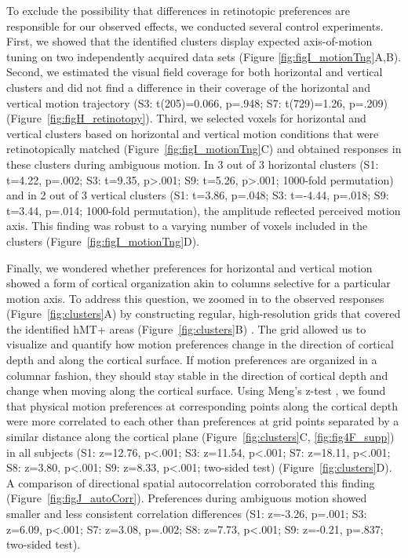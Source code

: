 To exclude the possibility that differences in retinotopic preferences are responsible for our observed effects, we conducted several control experiments. First, we showed that the identified clusters display expected axis-of-motion tuning on two independently acquired data sets (Figure  \ref{fig:figI_motionTng}A,B). Second, we estimated the visual field coverage for both horizontal and vertical clusters and did not find a difference in their coverage of the horizontal and vertical motion trajectory (S3: t(205)=0.066, p=.948; S7: t(729)=1.26, p=.209) (Figure~\ref{fig:figH_retinotopy}). Third, we selected voxels for horizontal and vertical clusters based on horizontal and vertical motion conditions that were retinotopically matched (Figure~\ref{fig:figI_motionTng}C) and obtained responses in these clusters during ambiguous motion. In 3 out of 3 horizontal clusters (S1: t=4.22, p=.002; S3: t=9.35, p\textgreater.001; S9: t=5.26, p\textgreater.001; 1000-fold permutation) and in 2 out of 3 vertical clusters (S1: t=3.86, p=.048; S3: t=-4.44, p=.018; S9: t=3.44, p=.014; 1000-fold permutation), the amplitude reflected perceived motion axis. This finding was robust to a varying number of voxels included in the clusters (Figure~\ref{fig:figI_motionTng}D).

Finally, we wondered whether preferences for horizontal and vertical motion showed a form of cortical organization akin to columns selective for a particular motion axis. To address this question, we zoomed in to the observed responses (Figure~\ref{fig:clusters}A) by constructing regular, high-resolution grids that covered the identified hMT+ areas (Figure~\ref{fig:clusters}B) \parencite{Zimmermann2011,Kemper2017}. The grid allowed us to visualize and quantify how motion preferences change in the direction of cortical depth and along the cortical surface. If motion preferences are organized in a columnar fashion, they should stay stable in the direction of cortical depth and change when moving along the cortical surface. Using Meng's z-test \parencite{Meng1992}, we found that physical motion preferences at corresponding points along the cortical depth were more correlated to each other than preferences at grid points separated by a similar distance along the cortical plane (Figure~\ref{fig:clusters}C, \ref{fig:fig4F_supp}) \parencite{Nasr2016} in all subjects (S1: z=12.76, p\textless.001; S3: z=11.54, p\textless.001; S7: z=18.11, p\textless.001; S8: z=3.80, p\textless.001; S9: z=8.33, p\textless.001; two-sided test) (Figure~\ref{fig:clusters}D). A comparison of directional spatial autocorrelation corroborated this finding (Figure~\ref{fig:figJ_autoCorr}). Preferences during ambiguous motion showed smaller and less consistent correlation differences (S1: z=-3.26, p=.001; S3: z=6.09, p\textless.001; S7: z=3.08, p=.002; S8: z=7.73, p\textless.001; S9: z=-0.21, p=.837; two-sided test).

